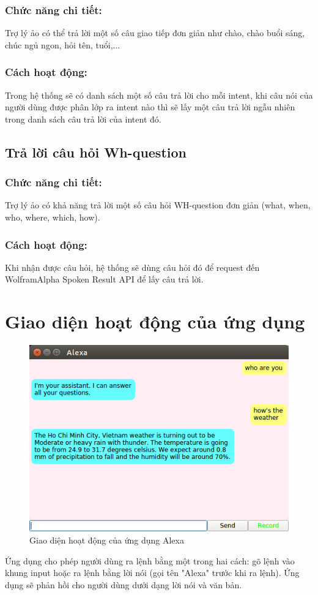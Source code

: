 \subsubsection{Chức năng chi tiết:}

Trợ lý ảo có thể trả lời một số câu giao tiếp đơn giản như chào, chào buổi sáng, chúc ngủ ngon, hỏi tên, tuổi,...

\subsubsection{Cách hoạt động:}

Trong hệ thống sẽ có danh sách một số câu trả lời cho mỗi intent, khi câu nói của người dùng được phân lớp ra intent nào thì sẽ lấy một câu trả lời ngẫu nhiên trong danh sách câu trả lời của intent đó.

\subsection{Trả lời câu hỏi Wh-question}

\subsubsection{Chức năng chi tiết:}

Trợ lý ảo có khả năng trả lời một số câu hỏi WH-question đơn giản (what, when, who, where, which, how).

\subsubsection{Cách hoạt động:}

Khi nhận được câu hỏi, hệ thống sẽ dùng câu hỏi đó để request đến WolframAlpha Spoken Result API để lấy câu trả lời.

\section{Giao diện hoạt động của ứng dụng}

\begin{figure}[H]
    \centering
    \includegraphics[scale=0.7]{interface}
    \caption{Giao diện hoạt động của ứng dụng Alexa}
    \label{fig:c6_interface}
\end{figure}

Ứng dụng cho phép người dùng ra lệnh bằng một trong hai cách: gõ lệnh vào khung input hoặc ra lệnh bằng lời nói (gọi tên "Alexa" trước khi ra lệnh). Ứng dụng sẽ phản hồi cho người dùng dưới dạng lời nói và văn bản.
